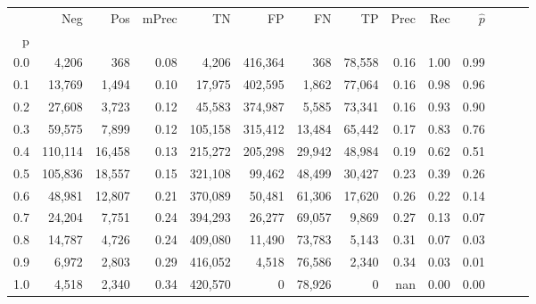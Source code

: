 \begin{tabular}{rrrrrrrrrrrrrr}
\toprule
{} &      Neg &     Pos & mPrec &       TN &       FP &      FN &      TP &  Prec &   Rec & $\hat{p}$ \\
p   &          &         &       &          &          &         &         &       &       &           \\
\midrule
0.0 &    4,206 &     368 &  0.08 &    4,206 &  416,364 &     368 &  78,558 &  0.16 &  1.00 &      0.99 \\
0.1 &   13,769 &   1,494 &  0.10 &   17,975 &  402,595 &   1,862 &  77,064 &  0.16 &  0.98 &      0.96 \\
0.2 &   27,608 &   3,723 &  0.12 &   45,583 &  374,987 &   5,585 &  73,341 &  0.16 &  0.93 &      0.90 \\
0.3 &   59,575 &   7,899 &  0.12 &  105,158 &  315,412 &  13,484 &  65,442 &  0.17 &  0.83 &      0.76 \\
0.4 &  110,114 &  16,458 &  0.13 &  215,272 &  205,298 &  29,942 &  48,984 &  0.19 &  0.62 &      0.51 \\
0.5 &  105,836 &  18,557 &  0.15 &  321,108 &   99,462 &  48,499 &  30,427 &  0.23 &  0.39 &      0.26 \\
0.6 &   48,981 &  12,807 &  0.21 &  370,089 &   50,481 &  61,306 &  17,620 &  0.26 &  0.22 &      0.14 \\
0.7 &   24,204 &   7,751 &  0.24 &  394,293 &   26,277 &  69,057 &   9,869 &  0.27 &  0.13 &      0.07 \\
0.8 &   14,787 &   4,726 &  0.24 &  409,080 &   11,490 &  73,783 &   5,143 &  0.31 &  0.07 &      0.03 \\
0.9 &    6,972 &   2,803 &  0.29 &  416,052 &    4,518 &  76,586 &   2,340 &  0.34 &  0.03 &      0.01 \\
1.0 &    4,518 &   2,340 &  0.34 &  420,570 &        0 &  78,926 &       0 &   nan &  0.00 &      0.00 \\
\bottomrule
\end{tabular}
